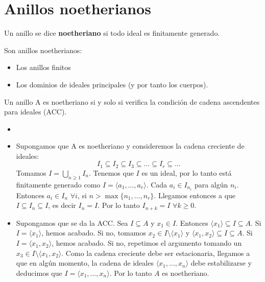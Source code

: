 \documentclass[twoside]{report}
\begin{document}
\section{Anillos noetherianos}
\begin{defi}
Un anillo se dice \textbf{noetheriano} si todo ideal es finitamente generado.
\end{defi}
\begin{prop}
Son anillos noetherianos:
\begin{itemize}
\item Los anillos finitos
\item Los dominios de ideales principales (y por tanto los cuerpos).
\end{itemize}
\end{prop}
\begin{prop}
Un anillo A es noetheriano si y solo si verifica la condición de cadena ascendentes para ideales (ACC). 
\end{prop}
\begin{dem}
\begin{itemize}
\item[]
	\item Supongamos que A es noetheriano y consideremos la cadena creciente de ideales:
	\[ I_1 \subseteq I_2 \subseteq I_3 \subseteq \dots \subseteq I_r \subseteq \dots \]
	Tomamos $I = \bigcup_{n\geq 1} I_n$. Tenemos que $I$ es un ideal, por lo tanto está finitamente generado como $I = \langle a_1, \dots, a_r \rangle$. Cada $a_i \in I_{n_i}$ para algún $n_i$. Entonces $a_i \in I_n$  $\forall i$, si $n > \max\{n_1,\dots,n_r\}$. Llegamos entonces a que $I \subseteq I_n \subseteq I$, es decir $I_n = I$. Por lo tanto $I_{n+k} = I$ $\forall k \geq 0$. 

	\item Supongamos que se da la ACC. Sea $I \subseteq A$ y $x_1 \in I$. Entonces $\langle x_1 \rangle \subseteq I \subseteq A$. Si $I = \langle x_1 \rangle$, hemos acabado. Si no, tomamos $x_2 \in I \setminus \langle x_1 \rangle$ y $\langle x_1, x_2 \rangle \subseteq I \subseteq A$. Si $I = \langle x_1, x_2 \rangle$, hemos acabado. Si no, repetimos el argumento tomando un $x_3 \in I \setminus \langle x_1,x_2 \rangle$. Como la cadena creciente debe ser estacionaria, llegamos a que en algún momento, la cadena de ideales $\langle x_1,\dots,x_n\rangle$ debe estabilizarse y deducimos que $I = \langle x_1,\dots,x_n\rangle$. Por lo tanto $A$ es noetheriano. 

\end{itemize}
\end{dem}
\end{document}

